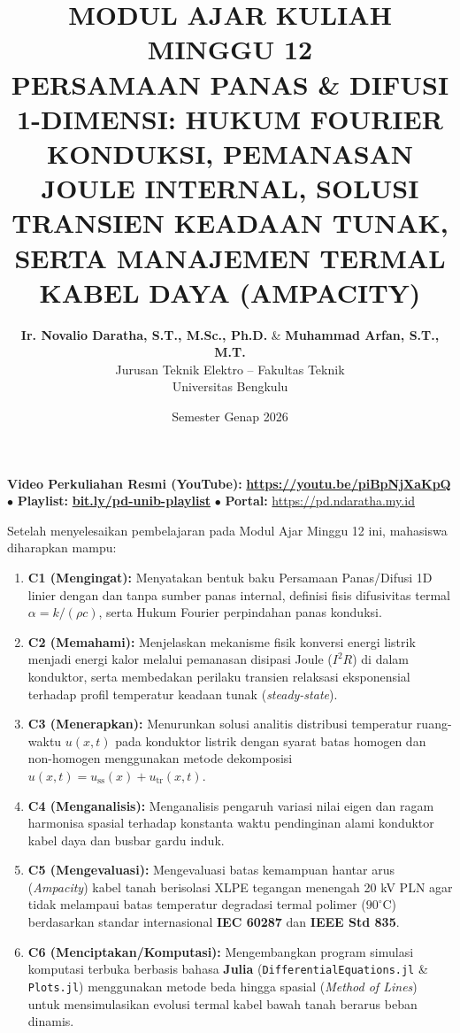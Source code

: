 \documentclass[11pt,a4paper]{article}
\title{\textbf{\Large MODUL AJAR KULIAH MINGGU 12}\\[0.3cm]
\textbf{\LARGE PERSAMAAN PANAS \& DIFUSI 1-DIMENSI: HUKUM FOURIER KONDUKSI, PEMANASAN JOULE INTERNAL, SOLUSI TRANSIEN KEADAAN TUNAK, SERTA MANAJEMEN TERMAL KABEL DAYA (AMPACITY)}}
\author{\textbf{Ir. Novalio Daratha, S.T., M.Sc., Ph.D.} \& \textbf{Muhammad Arfan, S.T., M.T.} \\ 
Jurusan Teknik Elektro -- Fakultas Teknik \\ 
Universitas Bengkulu}
\date{Semester Genap 2026}
\theoremstyle{definition}
\begin{document}
\maketitle
\begin{center}
  \vspace{-0.25cm}
  \begin{tcolorbox}[colback=red!4!white,colframe=red!75!black,boxrule=0.5pt,arc=2pt,left=6pt,right=6pt,top=3pt,bottom=3pt,width=0.98\textwidth]
    \centering\footnotesize
    \textbf{Video Perkuliahan Resmi (YouTube):} {\color{red!80!black}\textbf{\url{https://youtu.be/piBpNjXaKpQ}}} \quad $\bullet$ \quad \textbf{Playlist:} \href{https://www.youtube.com/playlist?list=PLS5oOZWXZeTw}{\color{blue!80!black}\textbf{bit.ly/pd-unib-playlist}} \quad $\bullet$ \quad \textbf{Portal:} \url{https://pd.ndaratha.my.id}
  \end{tcolorbox}
  \vspace{-0.15cm}
\end{center}


\begin{tcolorbox}[colback=blue!5!white,colframe=headercolor,title=\textbf{Capaian Pembelajaran Khusus (Sub-CPMK 6)}]
Setelah menyelesaikan pembelajaran pada Modul Ajar Minggu 12 ini, mahasiswa diharapkan mampu:
\begin{enumerate}[leftmargin=*]
    \item \textbf{C1 (Mengingat):} Menyatakan bentuk baku Persamaan Panas/Difusi 1D linier dengan dan tanpa sumber panas internal, definisi fisis difusivitas termal $\alpha = k/(\rho c)$, serta Hukum Fourier perpindahan panas konduksi.
    \item \textbf{C2 (Memahami):} Menjelaskan mekanisme fisik konversi energi listrik menjadi energi kalor melalui pemanasan disipasi Joule ($I^2 R$) di dalam konduktor, serta membedakan perilaku transien relaksasi eksponensial terhadap profil temperatur keadaan tunak (\textit{steady-state}).
    \item \textbf{C3 (Menerapkan):} Menurunkan solusi analitis distribusi temperatur ruang-waktu $u(x, t)$ pada konduktor listrik dengan syarat batas homogen dan non-homogen menggunakan metode dekomposisi $u(x, t) = u_{\text{ss}}(x) + u_{\text{tr}}(x, t)$.
    \item \textbf{C4 (Menganalisis):} Menganalisis pengaruh variasi nilai eigen dan ragam harmonisa spasial terhadap konstanta waktu pendinginan alami konduktor kabel daya dan busbar gardu induk.
    \item \textbf{C5 (Mengevaluasi):} Mengevaluasi batas kemampuan hantar arus (\textit{Ampacity}) kabel tanah berisolasi XLPE tegangan menengah 20 kV PLN agar tidak melampaui batas temperatur degradasi termal polimer ($90^\circ\text{C}$) berdasarkan standar internasional \textbf{IEC 60287} dan \textbf{IEEE Std 835}.
    \item \textbf{C6 (Menciptakan/Komputasi):} Mengembangkan program simulasi komputasi terbuka berbasis bahasa \textbf{Julia} (\texttt{DifferentialEquations.jl} \& \texttt{Plots.jl}) menggunakan metode beda hingga spasial (\textit{Method of Lines}) untuk mensimulasikan evolusi termal kabel bawah tanah berarus beban dinamis.
\end{enumerate}
\end{tcolorbox}
\end{document}
